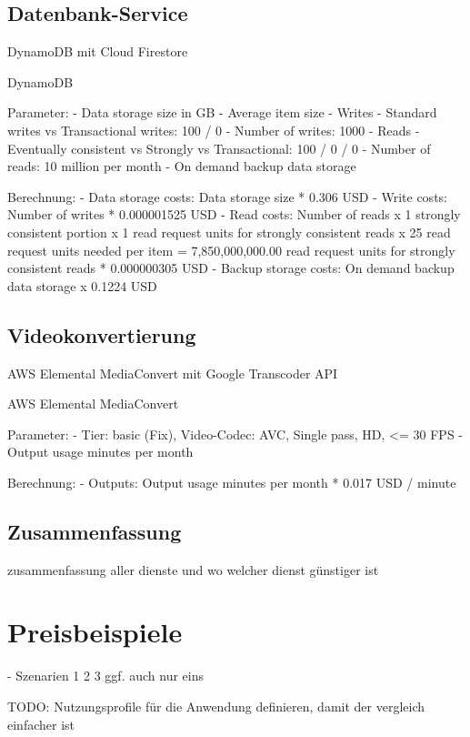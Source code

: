 \subsection{Datenbank-Service}

DynamoDB mit Cloud Firestore

DynamoDB

Parameter:
- Data storage size in GB
- Average item size
- Writes
    - Standard writes vs Transactional writes: 100 / 0
    - Number of writes: 1000
- Reads
    - Eventually consistent vs Strongly vs Transactional: 100 / 0 / 0
    - Number of reads: 10 million per month
- On demand backup data storage

Berechnung:
- Data storage costs: Data storage size * 0.306 USD
- Write costs: Number of writes * 0.000001525 USD
- Read costs: Number of reads x 1 strongly consistent portion x 1 read request units for strongly consistent reads x 25 read request units needed per item = 7,850,000,000.00 read request units for strongly consistent reads * 0.000000305 USD
- Backup storage costs: On demand backup data storage x 0.1224 USD

\subsection{Videokonvertierung}

AWS Elemental MediaConvert mit Google Transcoder API

AWS Elemental MediaConvert

Parameter:
- Tier: basic (Fix), Video-Codec: AVC, Single pass, HD, <= 30 FPS
- Output usage minutes per month

Berechnung:
- Outputs: Output usage minutes per month * 0.017 USD / minute

\subsection{Zusammenfassung}

zusammenfassung aller dienste und wo welcher dienst günstiger ist

\section{Preisbeispiele}

- Szenarien 1 2 3 ggf. auch nur eins

TODO: Nutzungsprofile für die Anwendung definieren, damit der vergleich einfacher ist